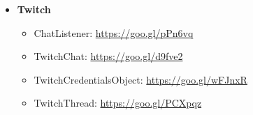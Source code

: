 \documentclass[12p]{article}
\begin{document}
\begin{itemize}
    \item \textbf{Twitch}
    \begin{itemize}
        \item ChatListener: \url{https://goo.gl/pPn6vq}
        \item TwitchChat: \url{https://goo.gl/d9fve2}
        \item TwitchCredentialsObject: \url{https://goo.gl/wFJnxR}
        \item TwitchThread: \url{https://goo.gl/PCXpqz}
    \end{itemize}
\end{itemize}

\end{document}
